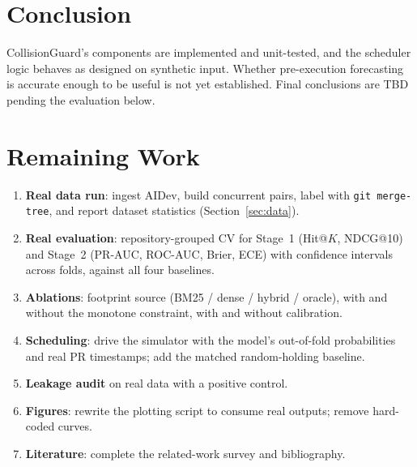 \documentclass[sigconf, authorversion, nonacm]{acmart}
\begin{document}
\section{Conclusion}
CollisionGuard's components are implemented and unit-tested, and the scheduler logic behaves as designed on synthetic input. Whether pre-execution forecasting is accurate enough to be useful is not yet established. Final conclusions are TBD pending the evaluation below.

\section{Remaining Work}
\label{sec:plan}
\begin{enumerate}
  \item \textbf{Real data run}: ingest AIDev, build concurrent pairs, label with \texttt{git merge-tree}, and report dataset statistics (Section~\ref{sec:data}).
  \item \textbf{Real evaluation}: repository-grouped CV for Stage~1 (Hit@$K$, NDCG@10) and Stage~2 (PR-AUC, ROC-AUC, Brier, ECE) with confidence intervals across folds, against all four baselines.
  \item \textbf{Ablations}: footprint source (BM25 / dense / hybrid / oracle), with and without the monotone constraint, with and without calibration.
  \item \textbf{Scheduling}: drive the simulator with the model's out-of-fold probabilities and real PR timestamps; add the matched random-holding baseline.
  \item \textbf{Leakage audit} on real data with a positive control.
  \item \textbf{Figures}: rewrite the plotting script to consume real outputs; remove hard-coded curves.
  \item \textbf{Literature}: complete the related-work survey and bibliography.
\end{enumerate}
\end{document}
